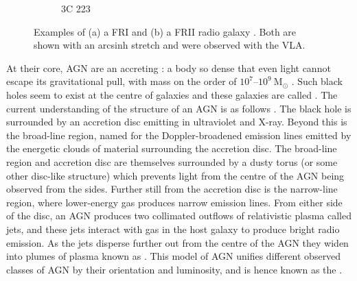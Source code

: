 \begin{figure}
\begin{subfigure}{0.45\textwidth}
                \caption{3C 223}
                \label{fig:3C223}
            \end{subfigure}
            \caption[Examples of a FRI and a FRII radio galaxy.]{\label{fig:fri-frii} Examples of (a) a FRI \citep{laing_rotation_1987} and (b) a FRII radio galaxy \citep{leahy_vla_1991}. Both are shown with an arcsinh stretch and were observed with the VLA.}
        \end{figure}

        At their core, AGN are an accreting : a body so dense that even light cannot escape its gravitational pull, with mass on the order of $10^7$--$10^9\ \mathrm{M}_\odot$ \citeneeded{}. Such black holes seem to exist at the centre of galaxies\citeneeded{} and these galaxies are called . The current understanding of the structure of an AGN is as follows \citep{urry_unified_1995}. The black hole is surrounded by an accretion disc emitting in ultraviolet and X-ray. Beyond this is the broad-line region, named for the Doppler-broadened emission lines emitted by the energetic clouds of material surrounding the accretion disc. The broad-line region and accretion disc are themselves surrounded by a dusty torus (or some other disc-like structure) which prevents light from the centre of the AGN being observed from the sides. Further still from the accretion disc is the narrow-line region, where lower-energy gas produces narrow emission lines. From either side of the disc, an AGN produces two collimated outflows of relativistic plasma called {jets}, and these jets interact with gas in the host galaxy to produce bright radio emission. As the jets disperse further out from the centre of the AGN they widen into plumes of plasma known as . This model of AGN unifies different observed classes of AGN by their orientation and luminosity, and is hence known as the  \citep{antonucci_unified_1993}.

